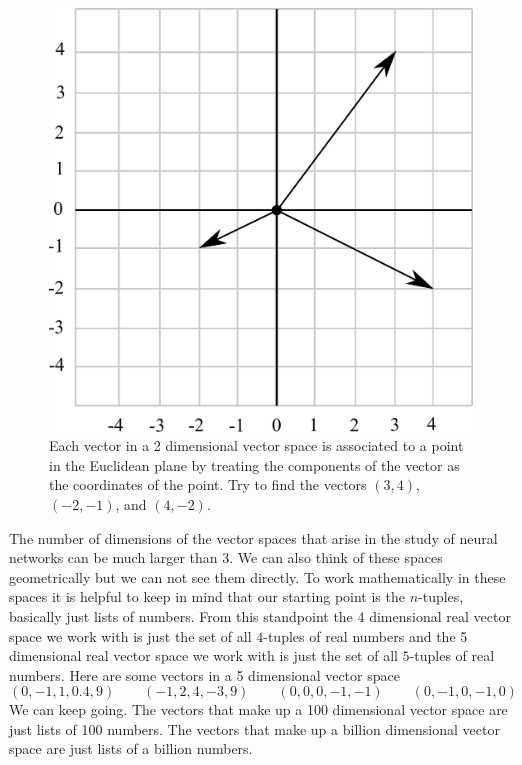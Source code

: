 \begin{figure}[h]
\centering
\includegraphics[scale=0.175]{./images/grid2.pdf}
\caption[Scott Hotton.]{Each vector in a 2 dimensional vector space is associated to a point 
in the Euclidean plane by treating the components of the vector as the 
coordinates of the point. Try to find the vectors $(3,4)$, $(-2,-1)$, and 
$(4,-2)$.} 
\label{2d}
\end{figure}

   The number of dimensions of the vector spaces that arise in the study of 
neural networks can be much larger than 3. We can also think of these spaces 
geometrically but we can not see them directly. To work mathematically in 
these spaces it is helpful to keep in mind that our starting point is the 
$n$-tuples, basically just lists of numbers. From this standpoint the 4 
dimensional real vector space we work with is just the set of all $4$-tuples of
real numbers and the 5 dimensional real vector space we work with is just the 
set of all $5$-tuples of real numbers. Here are some vectors in a 5 
dimensional vector space
\begin{equation*}
    (0,-1, 1, 0.4, 9)  \qquad
    (-1, 2, 4, -3, 9)  \qquad 
    (0, 0, 0, -1, -1 ) \qquad
    (0, -1, 0, -1, 0 ) 
\end{equation*}
We can keep going. The vectors that make up a 100 dimensional vector space are 
just lists of 100 numbers. The vectors that make up a billion dimensional 
vector space are just lists of a billion numbers. 

